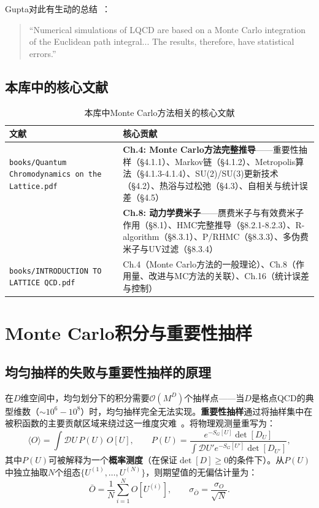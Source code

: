 \documentclass[12pt,a4paper]{ctexart}
\theoremstyle{definition}
\begin{document}
Gupta对此有生动的总结~\cite{Gupta1997intro}：
\begin{quote}
``Numerical simulations of LQCD are based on a Monte Carlo integration of the Euclidean path integral... The results, therefore, have statistical errors.''
\end{quote}

\subsection{本库中的核心文献}

\begin{table}[H]
\centering
\caption{本库中Monte Carlo方法相关的核心文献}
\label{tab:mc_papers}
\small
\begin{tabular}{lp{9cm}}
\toprule
文献 & 核心贡献 \\
\midrule
\texttt{books/Quantum Chromodynamics on the Lattice.pdf}~\cite{GattringerLang2010} &
\textbf{Ch.4: Monte Carlo方法完整推导}——重要性抽样（§4.1.1）、Markov链（§4.1.2）、Metropolis算法（§4.1.3-4.1.4）、SU(2)/SU(3)更新技术（§4.2）、热浴与过松弛（§4.3）、自相关与统计误差（§4.5）\\
& \textbf{Ch.8: 动力学费米子}——赝费米子与有效费米子作用（§8.1）、HMC完整推导（§8.2.1-8.2.3）、R-algorithm（§8.3.1）、P/RHMC（§8.3.3）、多伪费米子与UV过滤（§8.3.4）\\
\texttt{books/INTRODUCTION TO LATTICE QCD.pdf}~\cite{Gupta1997intro} &
Ch.4（Monte Carlo方法的一般理论）、Ch.8（作用量、改进与MC方法的关联）、Ch.16（统计误差与控制）\\
\bottomrule
\end{tabular}
\end{table}

\section{Monte Carlo积分与重要性抽样}

\subsection{均匀抽样的失败与重要性抽样的原理}

在$D$维空间中，均匀划分下的积分需要$\mathcal{O}(M^D)$个抽样点——当$D$是格点QCD的典型维数（$\sim 10^6-10^8$）时，均匀抽样完全无法实现。\textbf{重要性抽样}通过将抽样集中在被积函数的主要贡献区域来绕过这一维度灾难~\cite{GattringerLang2010}。将物理观测量重写为：
\begin{equation}
\langle O \rangle = \int \mathcal{D}U \, P(U) \, O[U], \qquad P(U) = \frac{e^{-S_G[U]} \det[D_U]}{\int \mathcal{D}U' e^{-S_G[U']} \det[D_{U'}]},
\label{eq:importance_sampling}
\end{equation}
其中$P(U)$可被解释为一个\textbf{概率测度}（在保证$\det[D]\ge 0$的条件下）。从$P(U)$中独立抽取$N$个组态$\{U^{(1)},\dots,U^{(N)}\}$，则期望值的无偏估计量为：
\begin{equation}
\bar O = \frac{1}{N} \sum_{i=1}^N O[U^{(i)}], \qquad \sigma_{\bar O} = \frac{\sigma_O}{\sqrt{N}}.
\label{eq:MC_estimator}
\end{equation}
\end{document}
